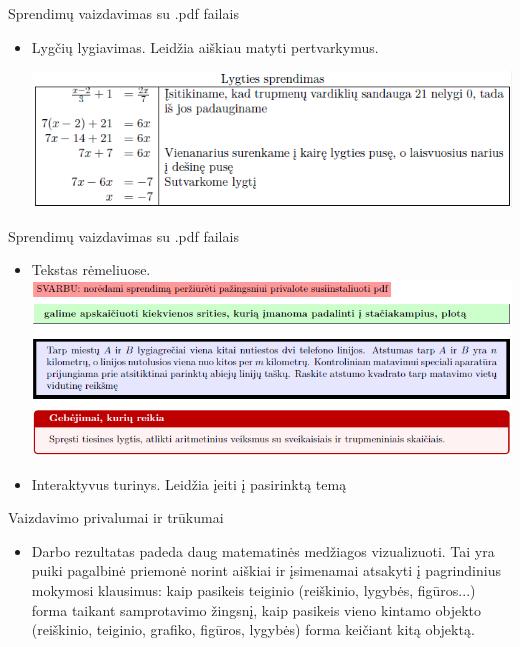 \documentclass{beamer}
\begin{document}
\begin{frame}[fragile]{Sprendimų vaizdavimas su .pdf failais}
\begin{itemize}
\item Lygčių lygiavimas. Leidžia aiškiau matyti pertvarkymus.

\includegraphics[width = \textwidth]{lygtys.png}
\end{itemize}
\end{frame}

\begin{frame}[fragile]{Sprendimų vaizdavimas su .pdf failais}
\begin{itemize}
\item Tekstas rėmeliuose. 
\includegraphics[width =0.9 \textwidth]{remai.png}
\item Interaktyvus turinys. Leidžia įeiti į pasirinktą temą
\end{itemize}
\end{frame}

\begin{frame}[fragile]{Vaizdavimo privalumai ir trūkumai}
\begin{itemize}
\item Darbo rezultatas padeda daug matematinės medžiagos vizualizuoti. Tai yra puiki pagalbinė priemonė norint aiškiai ir įsimenamai atsakyti į pagrindinius mokymosi klausimus: kaip pasikeis teiginio (reiškinio, lygybės, figūros...) forma taikant samprotavimo žingsnį, kaip pasikeis vieno kintamo objekto (reiškinio, teiginio, grafiko, figūros, lygybės) forma keičiant kitą objektą.
\end{itemize}
\end{frame}
\end{document}
